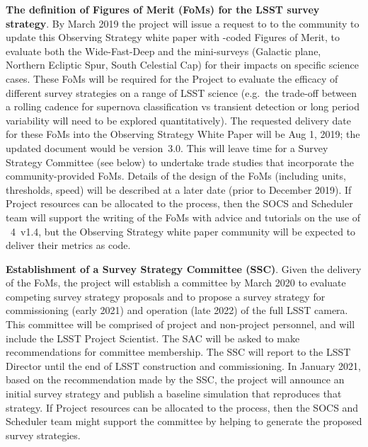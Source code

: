 \begin{description}
\item \textbf{The definition of Figures of Merit (FoMs) for the LSST
survey strategy}. By March 2019 the project will issue a request to
to the community to update this Observing Strategy white paper with
\MAF-coded Figures of Merit, to evaluate both the Wide-Fast-Deep and the
mini-surveys (Galactic plane, Northern Ecliptic Spur, South Celestial
Cap) for their impacts on specific science cases. These FoMs will be
required for the Project to evaluate the efficacy of different survey
strategies on a range of LSST science (e.g.\ the trade-off between a
rolling cadence for supernova classification vs transient detection or
long period variability will need to be explored quantitatively). The
requested delivery date for these \MAF FoMs into the Observing Strategy
White Paper will be Aug 1, 2019; the updated document would be version~3.0.
This will leave time for a Survey
Strategy Committee (see below) to undertake trade studies that
incorporate the community-provided FoMs. Details of the design of the
FoMs (including units, thresholds, speed) will be described at a later
date (prior to December 2019). If Project resources can be allocated to
the process, then the SOCS and Scheduler team will support the writing
of the FoMs with advice and tutorials on the use of \OpSim~4~v1.4, but
the Observing Strategy white paper community will be expected to deliver
their metrics as \MAF code.

\item \textbf{Establishment of a Survey Strategy Committee (SSC)}. Given
the delivery of the FoMs, the project will establish a committee by March
2020 to evaluate competing survey strategy proposals and to propose a
survey strategy for commissioning (early 2021) and operation (late 2022) of the full LSST camera.
This committee will be comprised of project and non-project personnel, and
will include the LSST Project Scientist. The SAC will be asked to
make recommendations for committee membership. The SSC will report to
the LSST Director until the end of LSST construction and commissioning.
In January 2021, based on the recommendation made by the SSC, the
project will announce an initial survey strategy and publish a baseline
simulation that reproduces that strategy. If Project resources can be
allocated to the process, then the SOCS and Scheduler team might support
the committee by helping to generate the proposed survey strategies.

\end{description}

